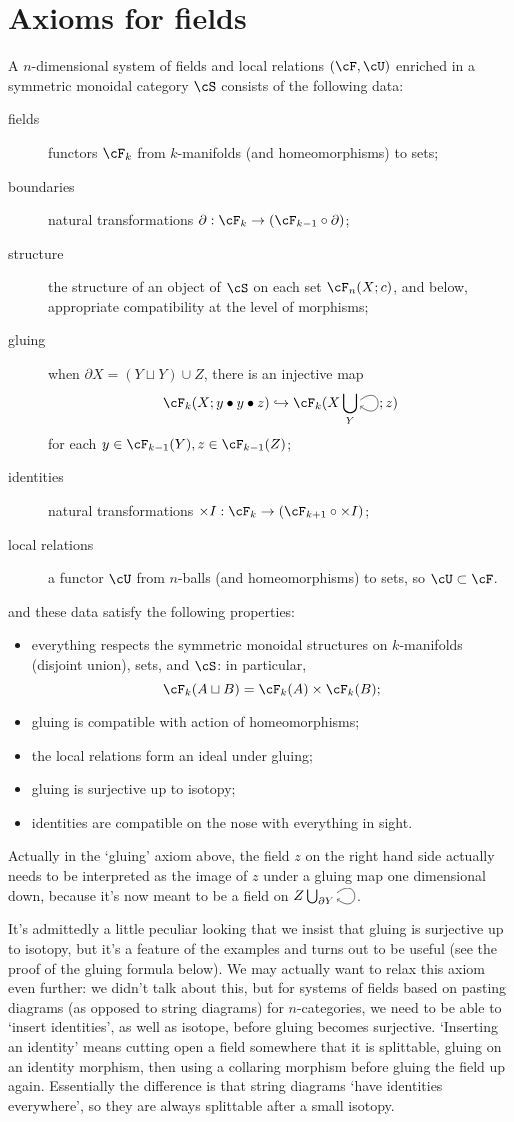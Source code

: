 \documentclass[11pt]{amsart}
\theoremstyle{plain}
\newcommand{\selfarrow}{\ensuremath{\smash{\tikz[baseline]{\clip (0,0.36) rectangle (0.48,-0.16); \draw[->] (0,0.175) .. controls (0.6,0.65) and (0.6,-0.45) .. (0,0.025);}}}}
\newcommand{\bdy}{\partial}
\newcommand{\into}{\hookrightarrow}
\begin{document}
\section{Axioms for fields}
A $n$-dimensional system of fields and local relations $(\cF, \cU)$ enriched in a symmetric monoidal category $\cS$ consists of the following data:
\begin{description}
\item[fields] functors $\cF_k$ from $k$-manifolds (and homeomorphisms) to sets;
\item[boundaries] natural transformations $\bdy : \cF_k \to (\cF_{k-1} \circ \bdy)$;
\item[structure] the structure of an object of $\cS$ on each set $\cF_n(X; c)$, and below, appropriate compatibility at the level of morphisms;
\item[gluing] when $\bdy X = (Y \sqcup Y) \cup Z$, there is an injective map $$\cF_k(X; y \bullet y \bullet z) \into \cF_k(X \bigcup_Y \selfarrow; z)$$ for each $y \in \cF_{k-1}(Y), z \in \cF_{k-1}(Z)$;
\item[identities] natural transformations $\times I: \cF_k \to (\cF_{k+1} \circ \times I)$;
\item[local relations] a functor $\cU$ from $n$-balls (and homeomorphisms) to sets, so $\cU \subset \cF$.
\end{description}
and these data satisfy the following properties:
\begin{itemize}
\item everything respects the symmetric monoidal structures on $k$-manifolds (disjoint union), sets, and $\cS$: in particular, $$\cF_k(A \sqcup B) = \cF_k(A) \times \cF_k(B);$$
\item gluing is compatible with action of homeomorphisms;
\item the local relations form an ideal under gluing;
\item gluing is surjective up to isotopy;
\item identities are compatible on the nose with everything in sight.
\end{itemize}

Actually in the `gluing' axiom above, the field $z$ on the right hand side actually needs to be interpreted as the image of $z$ under a gluing map one dimensional down, because it's now meant to be a field on $Z \bigcup_{\bdy Y} \selfarrow$.

It's admittedly a little peculiar looking that we insist that gluing is surjective up to isotopy, but it's a feature of the examples and turns out to be useful (see the proof of the gluing formula below). We may actually want to relax this axiom even further: we didn't talk about this, but for systems of fields based on pasting diagrams (as opposed to string diagrams) for $n$-categories, we need to be able to `insert identities', as well as isotope, before gluing becomes surjective. `Inserting an identity' means cutting open a field somewhere that it is splittable, gluing on an identity morphism, then using a collaring morphism before gluing the field up again. Essentially the difference is that string diagrams `have identities everywhere', so they are always splittable after a small isotopy.
\end{document}
